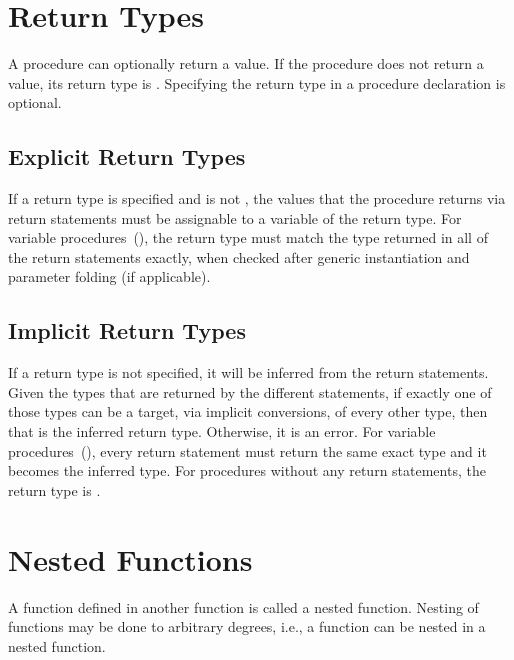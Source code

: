 \section{Return Types}
\label{Return_Types}

A procedure can optionally return a value.  If the procedure does not
return a value, its return type is .  Specifying the return
type in a procedure declaration is optional.

\subsection{Explicit Return Types}
\label{Explicit_Return_Types}

If a return type is specified and is not , the values that the procedure returns
via return statements must be assignable to a variable of the return
type.  For variable procedures~(), the return
type must match the type returned in all of the return statements
exactly, when checked after generic instantiation and parameter folding
(if applicable).

\subsection{Implicit Return Types}
\label{Implicit_Return_Types}

If a return type is not specified, it will be inferred from the return
statements.  Given the types that are returned by the different
statements, if exactly one of those types can be a target, via
implicit conversions, of every other type, then that is the inferred
return type.  Otherwise, it is an error.  For variable
procedures~(), every return statement must
return the same exact type and it becomes the inferred type.
For procedures without any return statements, the return type is .


\section{Nested Functions}
\label{Nested_Functions}

A function defined in another function is called a nested function.
Nesting of functions may be done to arbitrary degrees, i.e., a
function can be nested in a nested function.

